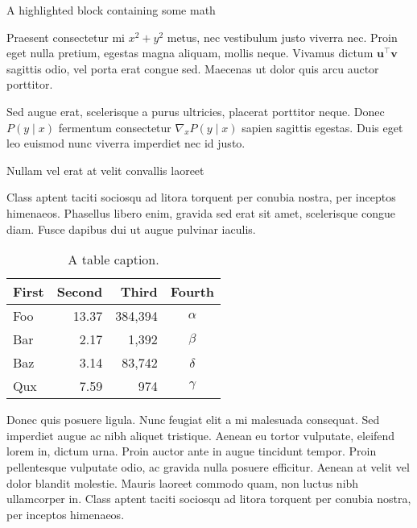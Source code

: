 \documentclass[final]{beamer}
\newlength{\colwidth}
\begin{document}
\begin{frame}[t]
\begin{columns}[t]
\begin{column}{\colwidth}
\begin{exampleblock}{A highlighted block containing some math}

    Praesent consectetur mi $x^2 + y^2$ metus, nec vestibulum justo viverra nec. Proin eget nulla pretium, egestas magna aliquam, mollis neque. Vivamus dictum $\mathbf{u}^\intercal\mathbf{v}$ sagittis odio, vel porta erat congue sed. Maecenas ut dolor quis arcu auctor porttitor.


    Sed augue erat, scelerisque a purus ultricies, placerat porttitor neque. Donec $P(y \mid x)$ fermentum consectetur $\nabla_x P(y \mid x)$ sapien sagittis egestas. Duis eget leo euismod nunc viverra imperdiet nec id justo.

  \end{exampleblock}

  \begin{block}{Nullam vel erat at velit convallis laoreet}

    Class aptent taciti sociosqu ad litora torquent per conubia nostra, per inceptos himenaeos. Phasellus libero enim, gravida sed erat sit amet, scelerisque congue diam. Fusce dapibus dui ut augue pulvinar iaculis.

    \begin{table}
      \centering
      \begin{tabular}{l r r c}
        \toprule
        \alert{First} & \alert{Second} & \alert{Third} & \alert{Fourth} \\
        \midrule
        Foo & 13.37 & 384,394 & $\alpha$ \\
        Bar & 2.17 & 1,392 & $\beta$ \\
        Baz & 3.14 & 83,742 & $\delta$ \\
        Qux & 7.59 & 974 & $\gamma$ \\
        \bottomrule
      \end{tabular}
      \caption{A table caption.}
    \end{table}

    Donec quis posuere ligula. Nunc feugiat elit a mi malesuada consequat. Sed imperdiet augue ac nibh aliquet tristique. Aenean eu tortor vulputate, eleifend lorem in, dictum urna. Proin auctor ante in augue tincidunt tempor. Proin pellentesque vulputate odio, ac gravida nulla posuere efficitur. Aenean at velit vel dolor blandit molestie. Mauris laoreet commodo quam, non luctus nibh ullamcorper in. Class aptent taciti sociosqu ad litora torquent per conubia nostra, per inceptos himenaeos.


\end{block}
\end{column}
\end{columns}
\end{frame}
\end{document}

